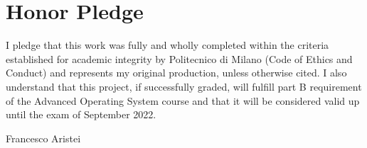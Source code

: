 \documentclass[10pt, oneside,english]{article}   	%
\begin{document}
\section{Honor Pledge}
I pledge that this work was fully and wholly completed within the criteria established for academic integrity by Politecnico di Milano
(Code of Ethics and Conduct) and represents my original production, unless otherwise cited.
I also understand that this project, if successfully graded, will fulfill part B requirement of the Advanced Operating System course
 and that it will be considered valid up until the exam of September 2022.

\begin{flushright}
        Francesco Aristei
\end{flushright}
\end{document}
